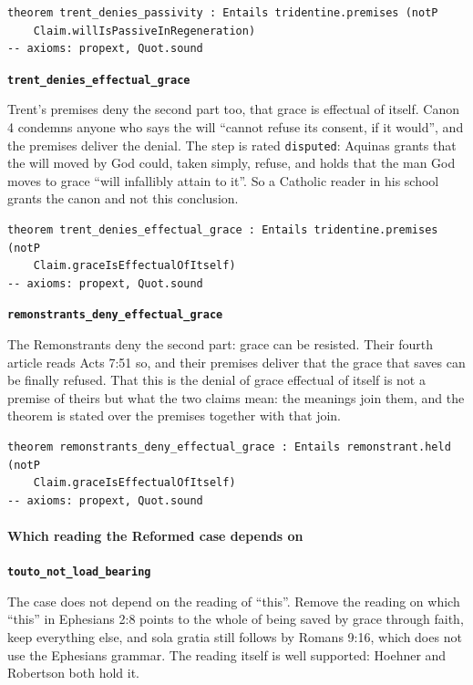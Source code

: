 \documentclass[11pt]{article}
\begin{document}
{\small\begin{verbatim}
theorem trent_denies_passivity : Entails tridentine.premises (notP
    Claim.willIsPassiveInRegeneration)
-- axioms: propext, Quot.sound
\end{verbatim}}
\par\medskip\noindent\textbf{\texttt{trent\_\allowbreak{}denies\_\allowbreak{}effectual\_\allowbreak{}grace}}\par\nobreak\noindent
Trent’s premises deny the second part too, that grace is effectual of itself. Canon 4 condemns anyone who says the will “cannot refuse its consent, if it would”, and the premises deliver the denial. The step is rated \texttt{disputed}: Aquinas grants that the will moved by God could, taken simply, refuse, and holds that the man God moves to grace “will infallibly attain to it”. So a Catholic reader in his school grants the canon and not this conclusion.

{\small\begin{verbatim}
theorem trent_denies_effectual_grace : Entails tridentine.premises (notP
    Claim.graceIsEffectualOfItself)
-- axioms: propext, Quot.sound
\end{verbatim}}
\par\medskip\noindent\textbf{\texttt{remonstrants\_\allowbreak{}deny\_\allowbreak{}effectual\_\allowbreak{}grace}}\par\nobreak\noindent
The Remonstrants deny the second part: grace can be resisted. Their fourth article reads Acts 7:51 so, and their premises deliver that the grace that saves can be finally refused. That this is the denial of grace effectual of itself is not a premise of theirs but what the two claims mean: the meanings join them, and the theorem is stated over the premises together with that join.

{\small\begin{verbatim}
theorem remonstrants_deny_effectual_grace : Entails remonstrant.held (notP
    Claim.graceIsEffectualOfItself)
-- axioms: propext, Quot.sound
\end{verbatim}}
\paragraph*{Which reading the Reformed case depends on}
\leavevmode\par\nobreak
\par\medskip\noindent\textbf{\texttt{touto\_\allowbreak{}not\_\allowbreak{}load\_\allowbreak{}bearing}}\par\nobreak\noindent
The case does not depend on the reading of “this”. Remove the reading on which “this” in Ephesians 2:8 points to the whole of being saved by grace through faith, keep everything else, and sola gratia still follows by Romans 9:16, which does not use the Ephesians grammar. The reading itself is well supported: Hoehner and Robertson both hold it.
\end{document}
